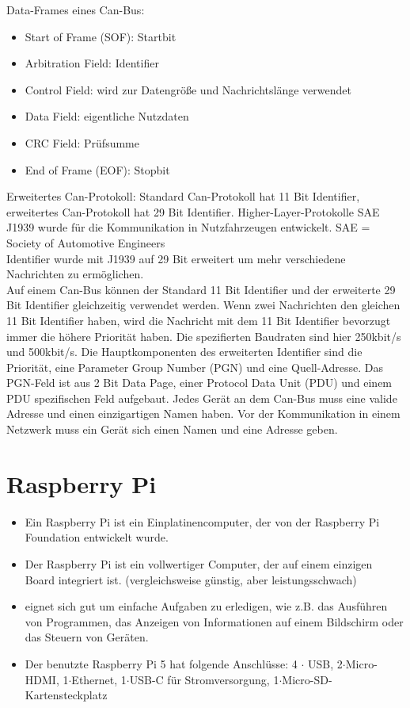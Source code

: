 Data-Frames eines Can-Bus:
\begin{itemize}
    \item Start of Frame (SOF): Startbit
    \item Arbitration Field: Identifier
    \item Control Field: wird zur Datengröße und Nachrichtslänge verwendet
    \item Data Field: eigentliche Nutzdaten
    \item CRC Field: Prüfsumme
    \item End of Frame (EOF): Stopbit
\end{itemize}
\cite[Seite 36]{Voss2008}

Erweitertes Can-Protokoll: 
Standard Can-Protokoll hat 11 Bit Identifier, erweitertes Can-Protokoll hat 29 Bit Identifier.
Higher-Layer-Protokolle SAE J1939 wurde für die Kommunikation in Nutzfahrzeugen entwickelt.
SAE = Society of Automotive Engineers\\
Identifier wurde mit J1939 auf 29 Bit erweitert um mehr verschiedene Nachrichten zu ermöglichen.\\
Auf einem Can-Bus können der Standard 11 Bit Identifier und der erweiterte 29 Bit Identifier gleichzeitig verwendet werden.
Wenn zwei Nachrichten den gleichen 11 Bit Identifier haben, wird die Nachricht mit dem 11 Bit Identifier bevorzugt immer die
höhere Priorität haben. Die spezifierten Baudraten sind hier 250kbit/s und 500kbit/s. Die Hauptkomponenten des
erweiterten Identifier sind die Priorität, eine Parameter Group Number (PGN) und eine Quell-Adresse.
Das PGN-Feld ist aus 2 Bit Data Page, einer Protocol Data Unit (PDU) und einem PDU spezifischen Feld 
aufgebaut.
Jedes Gerät an dem Can-Bus muss eine valide Adresse und einen einzigartigen Namen haben. Vor 
der Kommunikation in einem Netzwerk muss ein Gerät sich einen Namen und eine Adresse geben.
\cite{Murvay2018}



\section{Raspberry Pi}
\begin{itemize}
    \item Ein Raspberry Pi ist ein Einplatinencomputer, der von der Raspberry Pi Foundation entwickelt wurde.
    \item Der Raspberry Pi ist ein vollwertiger Computer, der auf einem einzigen Board integriert ist. (vergleichsweise günstig, aber leistungsschwach)
    \item eignet sich gut um einfache Aufgaben zu erledigen, wie z.B. das Ausführen von Programmen, das Anzeigen von Informationen auf einem Bildschirm oder das Steuern von Geräten.
    \item Der benutzte Raspberry Pi 5 hat folgende Anschlüsse: 4 $\cdot$ USB, 2$\cdot$Micro-HDMI, 1$\cdot$Ethernet, 1$\cdot$USB-C für Stromversorgung, 1$\cdot$Micro-SD-Kartensteckplatz
\end{itemize}

